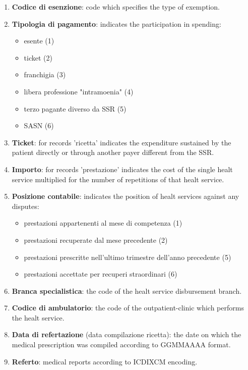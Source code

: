 \documentclass[paper=a4, fontsize=11pt]{scrartcl} %
\numberwithin{equation}{section} %
\numberwithin{figure}{section} %
\numberwithin{table}{section} %
\begin{document}
\begin{enumerate}
\begin{itemize}
\end{itemize}
\item \textbf{Codice di esenzione}: code which specifies the type of exemption.
\item \textbf{Tipologia di pagamento}: indicates the participation in spending:
\begin{itemize}
\item esente (1)
\item ticket (2)
\item franchigia (3)
\item libera professione "intramoenia" (4)
\item terzo pagante diverso da SSR (5)
\item SASN (6)
\end{itemize}
\item \textbf{Ticket}: for records 'ricetta' indicates the expenditure sustained by the patient directly or through another payer different from the SSR.
\item \textbf{Importo}: for records 'prestazione' indicates the cost of the single healt service multiplied for the number of repetitions of that healt service.
\item \textbf{Posizione contabile}: indicates the position of healt services against any disputes:
\begin{itemize}
\item prestazioni appartenenti al mese di competenza (1)
\item prestazioni recuperate dal mese precedente (2)
\item prestazioni prescritte nell'ultimo trimestre dell'anno precedente (5)
\item prestazioni accettate per recuperi straordinari (6)
\end{itemize}
\item \textbf{Branca specialistica}: the code of the healt service disbursement branch.
\item \textbf{Codice di ambulatorio}: the code of the outpatient-clinic which performs the healt service.
\item \textbf{Data di refertazione} (data compilazione ricetta): the date on which the medical prescription was compiled according to GGMMAAAA format. %
\item \textbf{Referto}: medical reports according to ICDIXCM encoding.
\end{enumerate}
\end{document}
